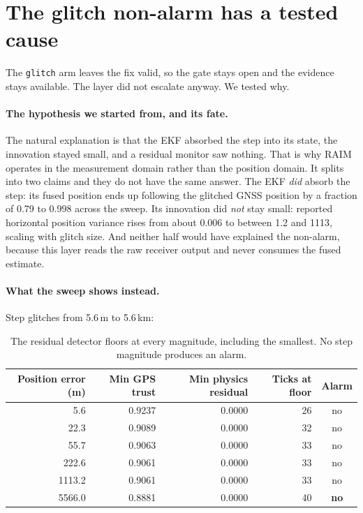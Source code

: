 \documentclass[11pt,a4paper]{article}
\newcommand{\code}[1]{\texttt{\small #1}}
\begin{document}
\section{The glitch non-alarm has a tested cause}
\label{sec:glitch}

The \code{glitch} arm leaves the fix valid, so the gate stays open and the
evidence stays available. The layer did not escalate anyway. We tested why.

\paragraph{The hypothesis we started from, and its fate.} The natural
explanation is that the EKF absorbed the step into its state, the innovation
stayed small, and a residual monitor saw nothing. That is why RAIM operates in
the measurement domain rather than the position domain. It splits into two
claims and they do not have the same answer. The EKF \emph{did} absorb the
step: its fused position ends up following the glitched GNSS position by a
fraction of 0.79 to 0.998 across the sweep. Its innovation did \emph{not} stay
small: reported horizontal position variance rises from about 0.006 to between
1.2 and 1113, scaling with glitch size. And neither half would have explained
the non-alarm, because this layer reads the raw receiver output and never
consumes the fused estimate.

\paragraph{What the sweep shows instead.} Step glitches from 5.6\,m to 5.6\,km:

\begin{table}[h]
\centering
\small
\begin{tabular}{rrrrc}
\toprule
Position error (m) & Min GPS trust & Min physics residual & Ticks at floor &
Alarm \\
\midrule
5.6    & 0.9237 & 0.0000 & 26 & no \\
22.3   & 0.9089 & 0.0000 & 32 & no \\
55.7   & 0.9063 & 0.0000 & 33 & no \\
222.6  & 0.9061 & 0.0000 & 33 & no \\
1113.2 & 0.9061 & 0.0000 & 33 & no \\
5566.0 & 0.8881 & 0.0000 & 40 & \textbf{no} \\
\bottomrule
\end{tabular}
\caption{The residual detector floors at every magnitude, including the
smallest. No step magnitude produces an alarm.}
\label{tab:glitchsweep}
\end{table}
\end{document}
